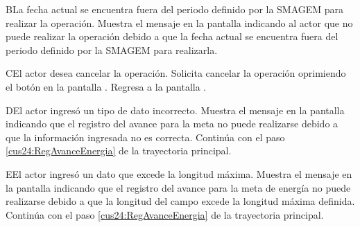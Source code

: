     \begin{UCtrayectoriaA}{B}{La fecha actual se encuentra fuera del periodo definido por la SMAGEM para realizar la operación.}
      \UCpaso[\UCsist] Muestra el mensaje  en la pantalla  indicando al actor que no puede realizar la operación debido a que la fecha actual se encuentra fuera del periodo definido por la SMAGEM para realizarla. 
  \end{UCtrayectoriaA}
 
    \begin{UCtrayectoriaA}{C}{El actor desea cancelar la operación.}
      \UCpaso[\UCactor] Solicita cancelar la operación oprimiendo el botón  en la pantalla .
      \UCpaso[] Regresa a la pantalla . 
    \end{UCtrayectoriaA}
 
    \begin{UCtrayectoriaA}{D}{El actor ingresó un tipo de dato incorrecto.}    
	\UCpaso[\UCsist] Muestra el mensaje  en la pantalla  indicando que el registro del avance para la meta no puede realizarse debido a que la información ingresada no es correcta.
	\UCpaso[] Continúa con el paso \ref{cus24:RegAvanceEnergia} de la trayectoria principal.     
    \end{UCtrayectoriaA}
    
    \begin{UCtrayectoriaA}{E}{El actor ingresó un dato que excede la longitud máxima.}    
	\UCpaso[\UCsist] Muestra el mensaje  en la pantalla  indicando que el registro del avance para la meta de energía no puede realizarse debido a que la longitud del campo excede la longitud máxima definida.
	\UCpaso[] Continúa con el paso \ref{cus24:RegAvanceEnergia} de la trayectoria principal.     
    \end{UCtrayectoriaA}
 
     